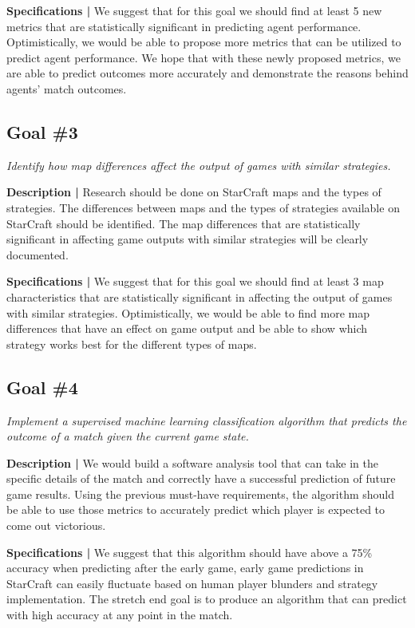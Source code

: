\documentclass[a4paper,12pt]{report}
\begin{document}
\textbf{Specifications |} We suggest that for this goal we should find at least 5 new metrics that are statistically significant in predicting agent performance. Optimistically, we would be able to propose more metrics that can be utilized to predict agent performance. We hope that with these newly proposed metrics, we are able to predict outcomes more accurately and demonstrate the reasons behind agents’ match outcomes. 

\subsection{Goal \#3}

\textit{Identify how map differences affect the output of games with similar strategies.}

\textbf{Description |} Research should be done on StarCraft maps and the types of strategies. The differences between maps and the types of strategies available on StarCraft should be identified. The map differences that are statistically significant in affecting game outputs with similar strategies will be clearly documented.

\textbf{Specifications |} We suggest that for this goal we should find at least 3 map characteristics that are statistically significant in affecting the output of games with similar strategies. Optimistically, we would be able to find more map differences that have an effect on game output and be able to show which strategy works best for the different types of maps.

\subsection{Goal \#4}

\textit{Implement a supervised machine learning classification algorithm that predicts the outcome of a match given the current game state.}

\textbf{Description |} We would build a software analysis tool that can take in the specific details of the match and correctly have a successful prediction of future game results. Using the previous must-have requirements, the algorithm should be able to use those metrics to accurately predict which player is expected to come out victorious.

\textbf{Specifications |} We suggest that this algorithm should have above a 75\% accuracy when predicting after the early game, early game predictions in StarCraft can easily fluctuate based on human player blunders and strategy implementation. The stretch end goal is to produce an algorithm that can predict with high accuracy at any point in the match.
\end{document}
